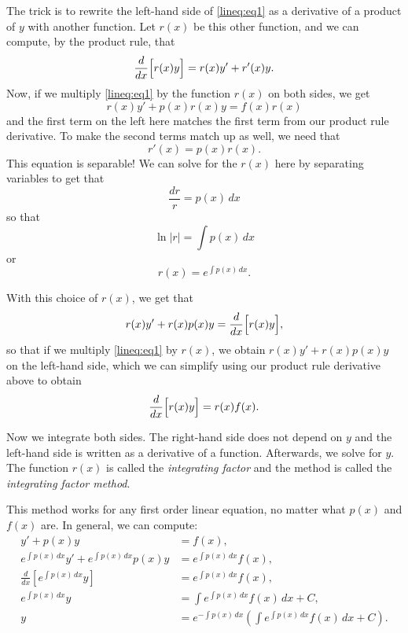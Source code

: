 \documentclass{ximera}
\begin{document}
The trick is to rewrite the left-hand side of \eqref{lineq:eq1} as a derivative of a product of $y$ with another function. Let $r(x)$ be this other function, and we can compute, by the product rule, that
\begin{equation*}
    \frac{d}{dx}\Bigl[r(x)y\Bigr] = r(x)y' + r'(x) y.
\end{equation*}
Now, if we multiply \eqref{lineq:eq1} by the function $r(x)$ on both sides, we get
\begin{equation*}
    r(x)y' + p(x)r(x)y = f(x)r(x)
\end{equation*}
and the first term on the left here matches the first term from our product rule derivative. To make the second terms match up as well, we need that
\begin{equation*}
    r'(x) = p(x)r(x).
\end{equation*}
This equation is separable! We can solve for the $r(x)$ here by separating variables to get that
\begin{equation*}
    \frac{dr}{r} = p(x)\, dx
\end{equation*}
so that 
\begin{equation*}
    \ln{|r|} = \int p(x)\, dx
\end{equation*}
or 
\begin{equation*}
    r(x) = e^{\int p(x) \,dx} .
\end{equation*}

With this choice of $r(x)$, we get that 
\begin{equation*}
    r(x) y' + r(x) p(x) y = \frac{d}{dx}\Bigl[ r(x) y \Bigr], 
\end{equation*}
so that if we multiply \eqref{lineq:eq1} by $r(x)$, we obtain $r(x) y' + r(x) p(x) y$ on the left-hand side, which we can simplify using our product rule derivative above to obtain
\begin{equation*}
    \frac{d}{dx}\Bigl[ r(x) y \Bigr] = r(x)f(x) .
\end{equation*}

Now we integrate both sides. The right-hand side does not depend on $y$ and the left-hand side is written as a derivative of a function.  Afterwards, we solve for $y$. The function $r(x)$ is called the \emph{integrating factor} and the method is called the \emph{integrating factor method}.

This method works for any first order linear equation, no matter what $p(x)$ and $f(x)$ are. In general, we can compute:
\begin{align*}
    y' + p(x) y &= f(x) , \\
    e^{\int p(x) \,dx} y' + e^{\int p(x) \,dx} p(x) y & = e^{\int p(x) \,dx} f(x) , \\
    \frac{d}{dx}\left[ e^{\int p(x) \,dx} y \right] & = e^{\int p(x) \,dx} f(x) , \\
    e^{\int p(x) \,dx} y & = \int e^{\int p(x) \,dx} f(x) \,dx + C , \\
    y & = e^{-\int p(x) \,dx} \left( \int e^{\int p(x) \,dx} f(x) \,dx + C \right) .
\end{align*}
\end{document}
